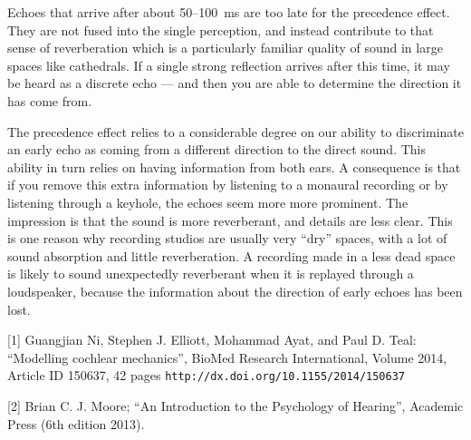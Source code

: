   Echoes that arrive after about 50--100~ms are too late for the precedence 
  effect. They are not fused into the single perception, and instead contribute 
  to that sense of reverberation which is a particularly familiar quality of 
  sound in large spaces like cathedrals. If a single strong reflection arrives 
  after this time, it may be heard as a discrete echo — and then you are able 
  to determine the direction it has come from. 

  The precedence effect relies to a considerable degree on our ability to 
  discriminate an early echo as coming from a different direction to the direct 
  sound. This ability in turn relies on having information from both ears. A 
  consequence is that if you remove this extra information by listening to a 
  monaural recording or by listening through a keyhole, the echoes seem more 
  more prominent. The impression is that the sound is more reverberant, and 
  details are less clear. This is one reason why recording studios are usually 
  very “dry” spaces, with a lot of sound absorption and little reverberation. A 
  recording made in a less dead space is likely to sound unexpectedly 
  reverberant when it is replayed through a loudspeaker, because the 
  information about the direction of early echoes has been lost. 



  \sectionreferences{}[1] Guangjian Ni, Stephen J. Elliott, Mohammad Ayat, and 
  Paul D. Teal: ``Modelling cochlear mechanics'', BioMed Research 
  International, Volume 2014, Article ID 150637, 42 pages 
  \tt{}http://dx.doi.org/10.1155/2014/150637\rm{} 

  [2] Brian C. J. Moore; ``An Introduction to the Psychology of Hearing'', 
  Academic Press (6th edition 2013). 